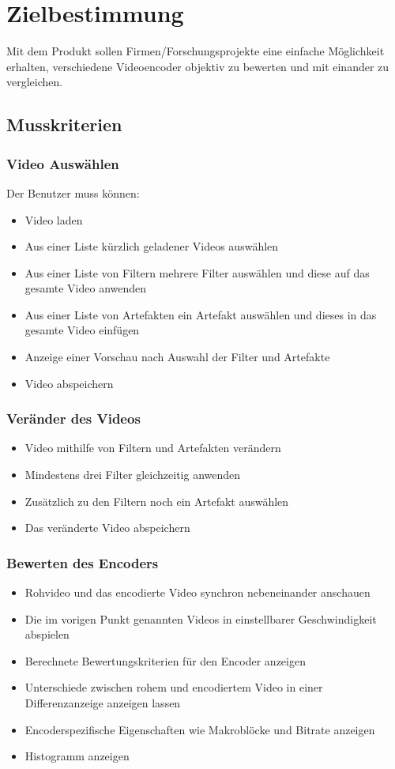 \documentclass[parskip=full]{scrartcl}
\begin{document}
\maketitle
\thispagestyle{empty}
\newpage
\tableofcontents
\newpage
\section{Zielbestimmung}
Mit dem Produkt sollen Firmen/Forschungsprojekte eine einfache Möglichkeit erhalten,
verschiedene Videoencoder objektiv zu bewerten und mit einander zu vergleichen.
\subsection{Musskriterien}
\subsubsection{Video Auswählen}
Der Benutzer muss können:
\begin{itemize}
\item Video laden
\item Aus einer Liste kürzlich geladener Videos auswählen
\item Aus einer Liste von Filtern mehrere Filter auswählen und diese auf das gesamte Video anwenden
\item Aus einer Liste von Artefakten ein Artefakt auswählen und dieses in das gesamte Video einfügen
\item Anzeige einer Vorschau nach Auswahl der Filter und Artefakte
\item Video abspeichern
\end{itemize}
\subsubsection{Veränder des Videos}
\begin{itemize}
\item Video mithilfe von Filtern und Artefakten verändern
\item Mindestens drei Filter gleichzeitig anwenden
\item Zusätzlich zu den Filtern noch ein Artefakt auswählen
\item Das veränderte Video abspeichern
\end{itemize}
\subsubsection{Bewerten des Encoders}
\begin{itemize}
\item Rohvideo und das encodierte Video synchron nebeneinander anschauen
\item Die im vorigen Punkt genannten Videos in einstellbarer Geschwindigkeit abspielen
\item Berechnete Bewertungskriterien für den Encoder anzeigen
\item Unterschiede zwischen rohem und encodiertem Video in einer Differenzanzeige anzeigen lassen
\item Encoderspezifische Eigenschaften wie Makroblöcke und Bitrate anzeigen
\item Histogramm anzeigen
\end{itemize}
\end{document}
